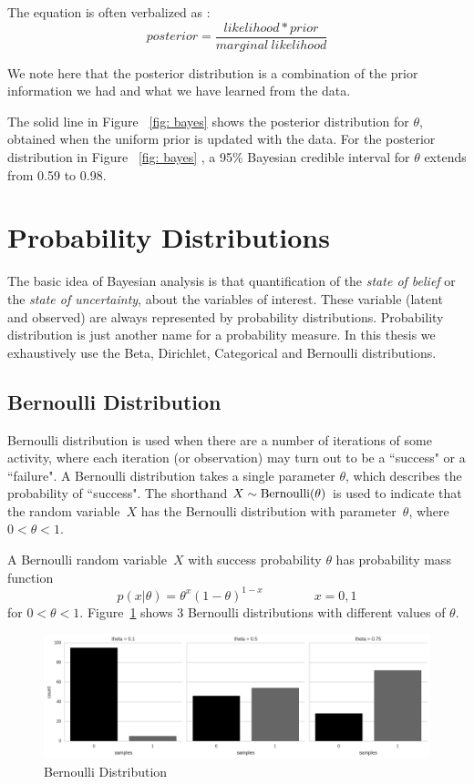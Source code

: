 The equation is often verbalized as :
\begin{equation}
	posterior = \frac{likelihood * prior}{marginal\ likelihood}
\end{equation}

We note here that the posterior distribution is a combination of the prior information we had and what we have learned from the data. 




The solid line in Figure ~\ref{fig: bayes} shows the posterior distribution for $\theta$, obtained when the uniform prior is updated with the data. For the posterior distribution in Figure ~\ref{fig: bayes} , a 95\% Bayesian credible interval for $\theta$ extends from 0.59 to 0.98.


\section{Probability Distributions }

The basic idea of Bayesian analysis is that quantification of the \emph{state of belief} or the \emph{state of uncertainty}, about the variables of interest. These variable (latent and observed) are always represented by probability distributions. Probability distribution is just another name for a probability measure. In this thesis we exhaustively use the Beta, Dirichlet, Categorical and Bernoulli distributions. 
 

\subsection*{Bernoulli Distribution}

Bernoulli distribution is used when there are a number of iterations of some activity, where each iteration  (or observation) may turn out to be a ``success" or a ``failure". A Bernoulli distribution takes a single parameter $\theta$, which describes the probability of ``success".  The shorthand $X \sim {\rm Bernoulli} (\theta)$ is used to indicate that the random variable~$X$ has the Bernoulli distribution with parameter~$\theta$, where $0 < \theta < 1$.

A Bernoulli random variable~$X$ with success probability $\theta$ has
probability mass function 
$$
p (x | \theta) = \theta ^ {x}  (1 - \theta) ^ {1 - x} \qquad \qquad x = 0, 1
$$
for $0 < \theta < 1$. Figure~\ref{fig:bernoulli_sample} shows 3 Bernoulli distributions with different values of $\theta$.
\begin{figure}[htp]
\centering
\includegraphics[width=\textwidth]{images/Bernoulli.png}
\caption{Bernoulli Distribution}
\label{fig:bernoulli_sample}
\end{figure}




